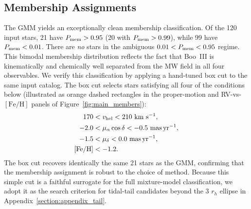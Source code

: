 \documentclass[twocolumn]{aastex631}
\begin{document}
\subsection{Membership Assignments}
The GMM yields an exceptionally clean membership classification.
Of the 120 input stars, 21 have $P_{\rm mem} > 0.95$ (20 with $P_{\rm mem} > 0.99$), while 99 have $P_{\rm mem} < 0.01$.
There are \emph{no} stars in the ambiguous $0.01 < P_{\rm mem} < 0.95$ regime.
This bimodal membership distribution reflects the fact that Boo~III is kinematically and chemically well separated from the MW field in all four observables.
We verify this classification by applying a hand-tuned box cut to the same input catalog.
The box cut selects stars satisfying all four of the conditions below (illustrated as orange dashed rectangles in the proper-motion and RV-vs-$[\mathrm{Fe/H}]$ panels of Figure~\ref{fig:main_members}):
\begin{align}
170 &< v_{\rm hel} < 210~\mathrm{km~s^{-1}}, \label{eq:boxcut_rv}\\
-2.0 &< \mu_\alpha\cos\delta < -0.5~\mathrm{mas\,yr^{-1}}, \label{eq:boxcut_pmra}\\
-1.5 &< \mu_\delta <  0.0~\mathrm{mas\,yr^{-1}}, \label{eq:boxcut_pmdec}\\
[\mathrm{Fe/H}] &< -1.2. \label{eq:boxcut_feh}
\end{align}
The box cut recovers identically the same 21 stars as the GMM, confirming that the membership assignment is robust to the choice of method. Because this simple cut is a faithful surrogate for the full mixture-model classification, we adopt it as the search criterion for tidal-tail candidates beyond the 3 $r_h$ ellipse in Appendix~\ref{section:appendix_tail}.
\end{document}
